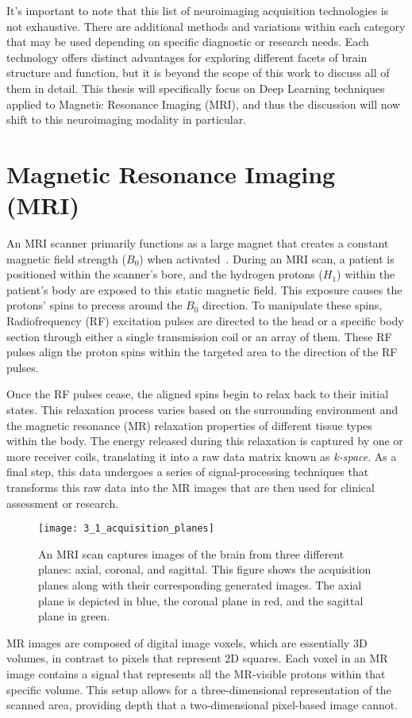 It's important to note that this list of neuroimaging acquisition technologies
is not exhaustive. There are additional methods and variations within each
category that may be used depending on specific diagnostic or research needs.
Each technology offers distinct advantages for exploring different facets of
brain structure and function, but it is beyond the scope of this work to discuss
all of them in detail. This thesis will specifically focus on Deep Learning
techniques applied to Magnetic Resonance Imaging (MRI), and thus the discussion
will now shift to this neuroimaging modality in particular.

\section{Magnetic Resonance Imaging (MRI)}
An MRI scanner primarily functions as a large magnet that creates a constant
magnetic field strength ($B_0$) when activated~.
During an MRI scan, a patient is positioned within the scanner's bore, and the
hydrogen protons ($H_1$) within the patient's body are exposed to this static
magnetic field. This exposure causes the protons' spins to
precess around the $B_0$ direction. To manipulate these spins,
Radiofrequency (RF) excitation pulses are directed to the head or a specific
body section through either a single transmission coil or an array of them.
These RF pulses align the proton spins within the targeted area to the direction
of the RF pulses.

Once the RF pulses cease, the aligned spins begin to relax back to their initial
states. This relaxation process varies based on the surrounding environment and
the magnetic resonance (MR) relaxation properties of different tissue types
within the body. The energy released during this relaxation is captured by one
or more receiver coils, translating it into a raw data matrix known as
\emph{k-space}. As a final step, this data undergoes a series of
signal-processing techniques that transforms this raw data into the MR images
that are then used for clinical assessment or research.
\begin{figure}
    \texttt{[image: 3\_1\_acquisition\_planes]}
    \caption[Acquisiton Planes of an MRI Scan]{An MRI scan captures images of the brain from three different
    planes: axial, coronal, and sagittal. This figure shows the acquisition
    planes along with their corresponding generated images. The axial plane is
    depicted in blue, the coronal plane in red, and the sagittal plane in green.
    }
\end{figure}
MR images are composed of digital image voxels, which are essentially 3D
volumes, in contrast to pixels that represent 2D squares. Each voxel in an MR
image contains a signal that represents all the MR-visible protons within that
specific volume. This setup allows for a three-dimensional representation of the
scanned area, providing depth that a two-dimensional pixel-based image cannot.

